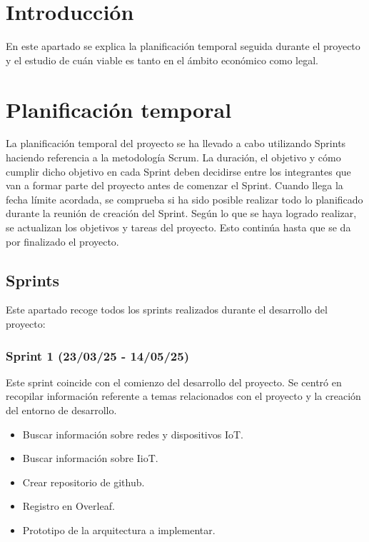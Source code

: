 
\section{Introducción}
En este apartado se explica la planificación temporal seguida durante el proyecto y el estudio de cuán viable es tanto en el ámbito económico como legal.
	
\section{Planificación temporal}
La planificación temporal del proyecto se ha llevado a cabo utilizando Sprints haciendo referencia a la metodología Scrum. La duración, el objetivo y cómo cumplir dicho objetivo en cada Sprint deben decidirse entre los integrantes que van a formar parte del proyecto antes de comenzar el Sprint.
Cuando llega la fecha límite acordada, se comprueba si ha sido posible realizar todo lo planificado durante la reunión de creación del Sprint. Según lo que se haya logrado realizar, se actualizan los objetivos y tareas del proyecto. Esto continúa hasta que se da por finalizado el proyecto.

\subsection{Sprints}
Este apartado recoge todos los sprints realizados durante el desarrollo del proyecto:

\subsubsection{Sprint 1 (23/03/25 - 14/05/25)}
Este sprint coincide con el comienzo del desarrollo del proyecto. Se centró en recopilar información referente a temas relacionados con el proyecto  y la creación del entorno de desarrollo.

\begin{itemize}
    \item Buscar información sobre redes y dispositivos IoT.
    \item Buscar información sobre IioT.
    \item Crear repositorio de github.
    \item Registro en Overleaf.
    \item Prototipo de la arquitectura a implementar.
\end{itemize}

